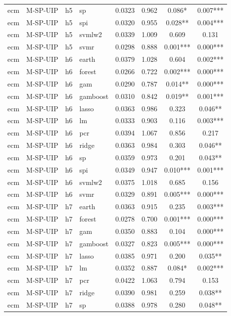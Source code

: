\begin{ThreePartTable}
\begin{longtable}[t]{llclcccc}
ecm & M-SP-UIP & h5 & sp & 0.0323 & 0.962 & 0.086* & 0.007***\\
ecm & M-SP-UIP & h5 & spi & 0.0320 & 0.955 & 0.028** & 0.004***\\
ecm & M-SP-UIP & h5 & svmlw2 & 0.0339 & 1.009 & 0.609 & 0.131\\
ecm & M-SP-UIP & h5 & svmr & 0.0298 & 0.888 & 0.001*** & 0.000***\\
\addlinespace
ecm & M-SP-UIP & h6 & earth & 0.0379 & 1.028 & 0.604 & 0.002***\\
ecm & M-SP-UIP & h6 & forest & 0.0266 & 0.722 & 0.002*** & 0.000***\\
ecm & M-SP-UIP & h6 & gam & 0.0290 & 0.787 & 0.014** & 0.000***\\
ecm & M-SP-UIP & h6 & gamboost & 0.0310 & 0.842 & 0.019** & 0.001***\\
ecm & M-SP-UIP & h6 & lasso & 0.0363 & 0.986 & 0.323 & 0.046**\\
ecm & M-SP-UIP & h6 & lm & 0.0333 & 0.903 & 0.116 & 0.003***\\
ecm & M-SP-UIP & h6 & pcr & 0.0394 & 1.067 & 0.856 & 0.217\\
ecm & M-SP-UIP & h6 & ridge & 0.0363 & 0.984 & 0.303 & 0.046**\\
ecm & M-SP-UIP & h6 & sp & 0.0359 & 0.973 & 0.201 & 0.043**\\
ecm & M-SP-UIP & h6 & spi & 0.0349 & 0.947 & 0.010*** & 0.001***\\
ecm & M-SP-UIP & h6 & svmlw2 & 0.0375 & 1.018 & 0.685 & 0.156\\
ecm & M-SP-UIP & h6 & svmr & 0.0329 & 0.891 & 0.005*** & 0.000***\\
\addlinespace
ecm & M-SP-UIP & h7 & earth & 0.0363 & 0.915 & 0.235 & 0.003***\\
ecm & M-SP-UIP & h7 & forest & 0.0278 & 0.700 & 0.001*** & 0.000***\\
ecm & M-SP-UIP & h7 & gam & 0.0350 & 0.883 & 0.104 & 0.000***\\
ecm & M-SP-UIP & h7 & gamboost & 0.0327 & 0.823 & 0.005*** & 0.000***\\
ecm & M-SP-UIP & h7 & lasso & 0.0385 & 0.971 & 0.200 & 0.035**\\
ecm & M-SP-UIP & h7 & lm & 0.0352 & 0.887 & 0.084* & 0.002***\\
ecm & M-SP-UIP & h7 & pcr & 0.0422 & 1.063 & 0.794 & 0.153\\
ecm & M-SP-UIP & h7 & ridge & 0.0390 & 0.981 & 0.259 & 0.038**\\
ecm & M-SP-UIP & h7 & sp & 0.0388 & 0.978 & 0.280 & 0.048**\\

\end{longtable}
\end{ThreePartTable}
